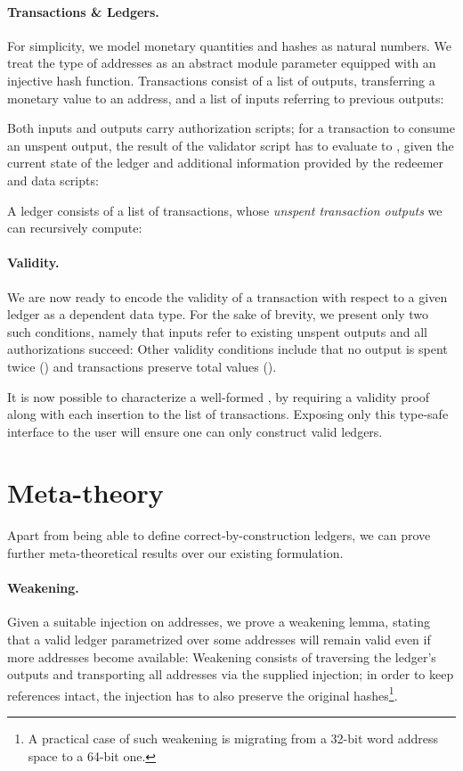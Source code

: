 \documentclass[sigplan,review,screen]{acmart}\settopmatter{printfolios=true,printccs=false,printacmref=false}
\begin{document}
\paragraph{Transactions \& Ledgers.}
For simplicity, we model monetary quantities and hashes as natural numbers.
We treat the type of addresses as an abstract module parameter equipped with an injective hash function.
Transactions consist of a list of outputs, transferring a monetary value to an address, and a list of inputs
referring to previous outputs:
\basic{}

Both inputs and outputs carry authorization scripts; for a transaction to consume an unspent output, the
result of the validator script has to evaluate to \inlineTrue{}, given the current state of the ledger and
additional information provided by the redeemer and data scripts:
\auth{}

A ledger consists of a list of transactions, whose \textit{unspent transaction outputs} we can recursively compute:
\utxo{}

\paragraph{Validity.}
We are now ready to encode the validity of a transaction with respect to a given ledger as a dependent data type.
For the sake of brevity, we present only two such conditions, namely that inputs refer to existing unspent outputs
and all authorizations succeed:
\valid{}
Other validity conditions include that no output is spent twice (\inlineNDS{})
and transactions preserve total values (\inlinePV{}).

It is now possible to characterize a well-formed \inlineLedger{},
by requiring a validity proof along with each insertion to the list of transactions.
Exposing only this type-safe interface to the user will ensure one can only construct valid ledgers.

\section{Meta-theory}
\label{sec:meta}
Apart from being able to define correct-by-construction ledgers, we can prove further meta-theoretical results over our
existing formulation.

\paragraph{Weakening.}
Given a suitable injection on addresses, we prove a weakening lemma, stating that a valid ledger
parametrized over some addresses will remain valid even if more addresses become available:
\weakening{}
Weakening consists of traversing the ledger's outputs and transporting all addresses via the supplied injection;
in order to keep references intact, the injection has to also preserve the original hashes\footnote{
A practical case of such weakening is migrating from a 32-bit word address space to a 64-bit one.
}.
\end{document}
